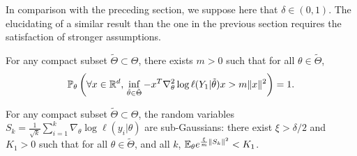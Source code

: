 In comparison with the preceding section, we suppose here that $\delta\in(0,1)$.
The elucidating of a similar result than the one in the previous section requires the satisfaction of stronger assumptions.




\begin{assu}\label{assu:infeighes}
    For any compact subset $\tilde\Theta\subset\Theta$,
    there exists $m>0$ such that for all $\theta\in\tilde\Theta$,
    \begin{equation}
        \mathbb{P}_\theta\left(\forall x\in\mathbb{R}^d,\, \inf_{\tilde\theta\in\tilde\Theta}-x^T\nabla_\theta^2\log\ell(Y_1|\tilde\theta)x>m\|x\|^2 \right) = 1.     
    \end{equation}
\end{assu}




\begin{assu}\label{assu:gausstailSk}
    For any compact subset $\tilde\Theta\subset\Theta$,
    the random variables
        $S_k=\frac{1}{\sqrt{k}}\sum_{i=1}^k\nabla_\theta\log\ell(y_i|\theta)    $
     are sub-Gaussians: there exist $\xi>\delta/2$ and $K_1>0$ such that for all $\theta\in\tilde\Theta$, and all $k$, $\mathbb{E}_\theta e^{\frac{\xi}{m}\|S_k\|^2}<K_1$.
\end{assu}







